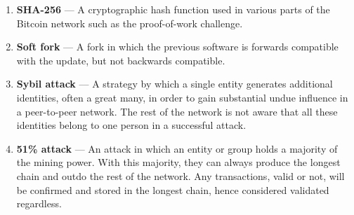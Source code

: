 \documentclass[11pt]{article}
\begin{document}
\begin{enumerate}
        \item \textbf{SHA-256} --- A cryptographic hash function used in various parts of the Bitcoin network such as the proof-of-work challenge.
        \item \textbf{Soft fork} --- A fork in which the previous software is forwards compatible with the update, but not backwards compatible.
        \item \textbf{Sybil attack} --- A strategy by which a single entity generates additional identities, often a great many, in order to gain substantial undue influence in a peer-to-peer network. The rest of the network is not aware that all these identities belong to one person in a successful attack.
        \item \textbf{51\% attack} --- An attack in which an entity or group holds a majority of the mining power. With this majority, they can always produce the longest chain and outdo the rest of the network. Any transactions, valid or not, will be confirmed and stored in the longest chain, hence considered validated regardless.
    \end{enumerate}
\end{document}
